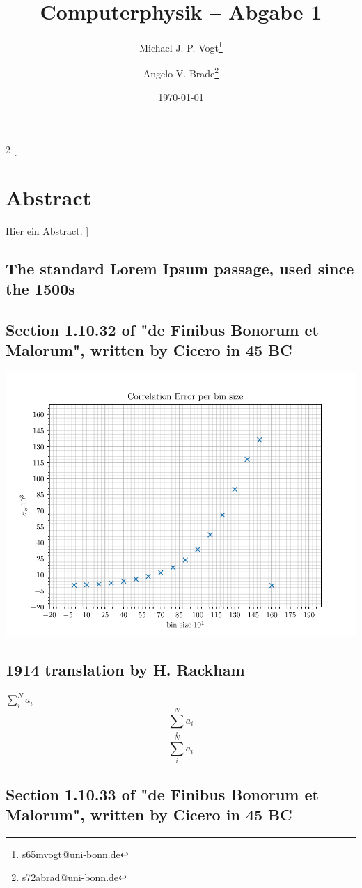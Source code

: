 \documentclass[10pt]{article}
\title{Computerphysik -- Abgabe 1}
\author[1]{Michael J. P. Vogt\thanks{s65mvogt@uni-bonn.de}}
\author[1]{Angelo V. Brade\thanks{s72abrad@uni-bonn.de}}
\affil[1]{Rhenish Friedrich Wilhelm University of Bonn}
\date{\today}
\newenvironment{Figure}
  {\par\medskip\noindent\minipage{\linewidth}}
  {\endminipage\par\medskip}
\begin{document}
\maketitle
\newpage

\tableofcontents
\newpage


\pagestyle{fancy}
\fancyhead[R]{\thepage}
\fancyhead[L]{\leftmark}

\begin{multicols}{2}
[
    \section{Abstract}
    Hier ein Abstract.
]
\subsection{The standard Lorem Ipsum passage, used since the 1500s}
\lipsum[1]

\lipsum[6]

\subsection{Section 1.10.32 of "de Finibus Bonorum et Malorum", written by Cicero in 45 BC}
\lipsum[2]
\begin{Figure}
    \centering
    \includegraphics[width=1.0\linewidth]{CorrelationErrorPerBinSize}
\end{Figure}
\lipsum[3]

\subsection{1914 translation by H. Rackham}
\lipsum[4]
\(\sum_{i}^{N}a_i\)
\[\sum_{i}^{N}a_i\]
\begin{equation}
\sum_{i}^{N}a_i
\end{equation}

\subsection{Section 1.10.33 of "de Finibus Bonorum et Malorum", written by Cicero in 45 BC}
\lipsum[5]


\end{multicols}
\end{document}
